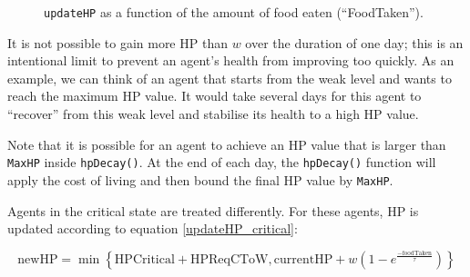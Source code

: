 \begin{figure}[htb]%
    \centering
    \qquad
    \caption{\texttt{updateHP} as a function of the amount of food eaten (``FoodTaken'').}%
    \label{fig:updateHP}%
\end{figure}

It is not possible to gain more HP than $w$ over the duration of one day; this is an intentional limit to prevent an agent's health from improving too quickly. As an example, we can think of an agent that starts from the weak level and wants to reach the maximum HP value. It would take several days for this agent to ``recover'' from this weak level and stabilise its health to a high HP value. 

Note that it is possible for an agent to achieve an HP value that is larger than \texttt{MaxHP} inside \lstinline$hpDecay()$. At the end of each day, the \lstinline$hpDecay()$ function will apply the cost of living and then bound the final HP value by \lstinline$MaxHP$.


Agents in the critical state are treated differently. For these agents, HP is updated according to equation \eqref{updateHP_critical}:

\begin{equation}\label{updateHP_critical}
    \text{newHP} = \min\left\{\text{HPCritical}+\text{HPReqCToW}, \text{currentHP} +w(1-e^{\frac{-\text{foodTaken}}{\tau}})\right\}
\end{equation}

